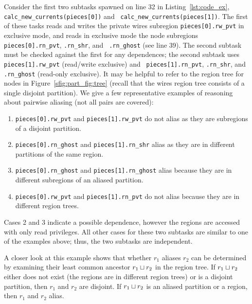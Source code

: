 Consider the first two subtasks spawned on line 32 
in Listing~\ref{lst:code_ex}, {\tt
calc\_new\_currents(pieces[0])} and {\tt
calc\_new\_currents(pieces[1])}.  The first of these tasks reads and
writes the private wires subregion {\tt pieces[0].rw\_pvt} in
exclusive mode, and reads in exclusive mode the node subregions {\tt
pieces[0].rn\_pvt}, {\tt .rn\_shr}, and {\tt
.rn\_ghost} (see line 39).  The second subtask must be
checked against the first for any dependences; the second subtask uses
{\tt pieces[1].rw\_pvt} (read/write exclusive) and {\tt
pieces[1].rn\_pvt}, {\tt .rn\_shr}, and {\tt .rn\_ghost} (read-only exclusive).
It may be helpful to refer to the region tree for nodes in Figure~\ref{sfig:part_fig:tree} (recall that the wires region tree consists of a single disjoint partition).  We give a few representative examples
of reasoning about pairwise aliasing (not all pairs are covered):
\begin{enumerate}
\item {\tt pieces[0].rw\_pvt} and {\tt pieces[1].rw\_pvt} do not alias as they are subregions of a disjoint partition.
\item {\tt pieces[0].rn\_ghost} and {\tt pieces[1].rn\_shr} alias as they are in different
  partitions of the same region.
\item {\tt pieces[0].rn\_ghost} and {\tt pieces[1].rn\_ghost} alias because they are in different subregions of
an aliased partition.
\item {\tt pieces[0].rw\_pvt} and {\tt pieces[1].rn\_pvt}
do not alias because they are in different region trees.
\end{enumerate}
Cases 2 and 3 indicate a possible dependence, however the regions are
accessed with only read privileges. All other cases for these two
subtasks are similar to one of the examples above; thus, the two
subtasks are independent.

A closer look at this example shows that whether 
$r_1$ aliases $r_2$ can be determined by examining
their least common ancestor $r_1 \sqcup r_2$ in the region tree.  
If $r_1 \sqcup r_2$ either does not exist (the regions
are in different region trees) or is a disjoint partition, then $r_1$
and $r_2$ are disjoint.  If $r_1 \sqcup r_2$ is an
aliased partition or a region, 
then $r_1$ and $r_2$ alias.

